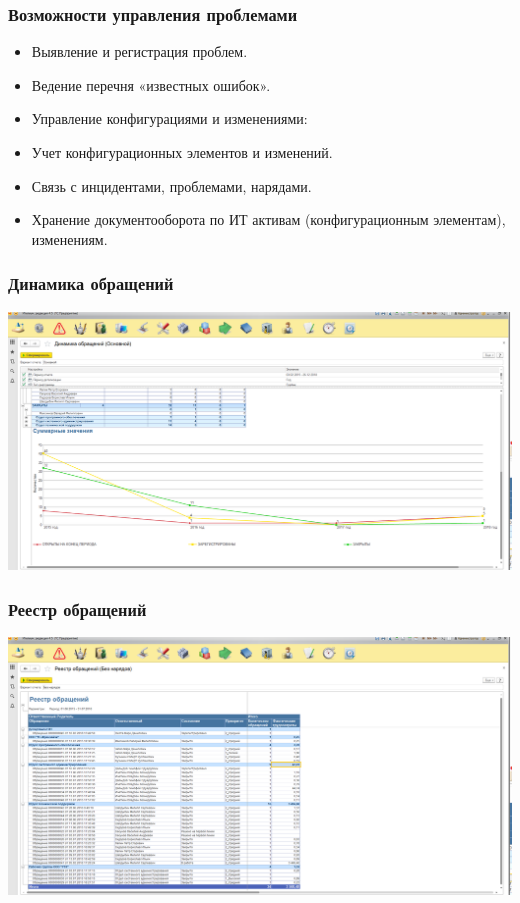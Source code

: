 \documentclass{../industrial-development}
\begin{document}
\begin{frame} \frametitle{Возможности управления проблемами}
	\begin{itemize}
    \item Выявление и регистрация проблем.
    \item Ведение перечня «известных ошибок».
    \item Управление конфигурациями и изменениями:
    \item Учет конфигурационных элементов и изменений.
    \item Связь с инцидентами, проблемами, нарядами.
    \item Хранение документооборота по ИТ активам (конфигурационным элементам), изменениям. 
	\end{itemize}
\end{frame}
\lecturenotes

\begin{frame} \frametitle{Динамика обращений}
\centerline{\includegraphics[width=\textwidth]{pic11.png}}
\end{frame}
\lecturenotes

\begin{frame} \frametitle{Реестр обращений}
\centerline{\includegraphics[width=\textwidth]{pic14.png}}
\end{frame}
\lecturenotes
\end{document}
